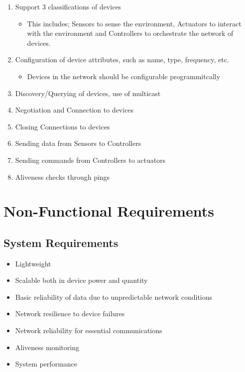 \begin{enumerate}
	\item Support 3 classifications of devices
	\begin{itemize}
		\item This includes; Sensors to sense the environment, Actuators to interact with the environment and Controllers to orchestrate the network of devices.
	\end{itemize}
	\item Configuration of device attributes, such as name, type, frequency, etc.
	\begin{itemize}
		\item Devices in the network should be configurable programmitcally 
	\end{itemize}
	\item Discovery/Querying of devices, use of multicast
	\item Negotiation and Connection to devices
	\item Closing Connections to devices
	\item Sending data from Sensors to Controllers
	\item Sending commands from Controllers to actuators
	\item Aliveness checks through pings
\end{enumerate}

\section{Non-Functional Requirements} %
\label{sec:non_functional_requirements}

\subsection{System Requirements} %
\label{sub:system_requirements}
\begin{itemize}
	\item Lightweight
	\item Scalable both in device power and quantity
	\item Basic reliability of data due to unpredictable network conditions
	\item Network resilience to device failures
	\item Network reliability for essential communications
	\item Aliveness monitoring
	\item System performance
\end{itemize}

